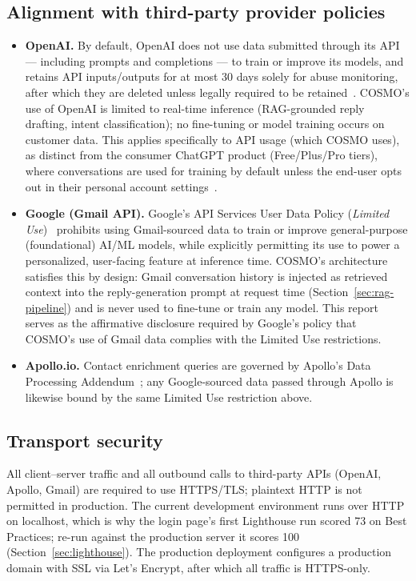 \documentclass[a4paper]{article}
\begin{document}
\subsection{Alignment with third-party provider policies}
\begin{itemize}
  \item \textbf{OpenAI.} By default, OpenAI does not use data submitted
  through its API --- including prompts and completions --- to train
  or improve its models, and retains API inputs/outputs for at most 30
  days solely for abuse monitoring, after which they are deleted unless
  legally required to be
  retained~\cite{openai_enterprise_privacy, openai_data_controls}.
  COSMO's use of OpenAI is limited to real-time inference (RAG-grounded
  reply drafting, intent classification); no fine-tuning or model
  training occurs on customer data. This applies specifically to API
  usage (which COSMO uses), as distinct from the consumer ChatGPT
  product (Free/Plus/Pro tiers), where conversations are used for
  training by default unless the end-user opts out in their personal
  account settings~\cite{openai_data_controls}.
  \item \textbf{Google (Gmail API).} Google's API Services User Data
  Policy (\emph{Limited Use})~\cite{google_api_user_data_policy}
  prohibits using Gmail-sourced data to train or improve
  general-purpose (foundational) AI/ML models, while explicitly
  permitting its use to power a personalized, user-facing feature at
  inference time. COSMO's architecture satisfies this by design: Gmail
  conversation history is injected as retrieved context into the
  reply-generation prompt at request time (Section~\ref{sec:rag-pipeline})
  and is never used to fine-tune or train any model. This report serves
  as the affirmative disclosure required by Google's policy that COSMO's
  use of Gmail data complies with the Limited Use restrictions.
  \item \textbf{Apollo.io.} Contact enrichment queries are governed by
  Apollo's Data Processing Addendum~\cite{apollo_dpa}; any Google-sourced
  data passed through Apollo is likewise bound by the same Limited Use
  restriction above.
\end{itemize}

\subsection{Transport security}
All client--server traffic and all outbound calls to third-party APIs
(OpenAI, Apollo, Gmail) are required to use HTTPS/TLS; plaintext HTTP
is not permitted in production. The current development environment
runs over HTTP on localhost, which is why the login page's first
Lighthouse run scored 73 on Best Practices; re-run against the production
server it scores 100 (Section~\ref{sec:lighthouse}). The
production deployment configures
a production domain with SSL via Let's Encrypt, after which all traffic
is HTTPS-only.
\end{document}
